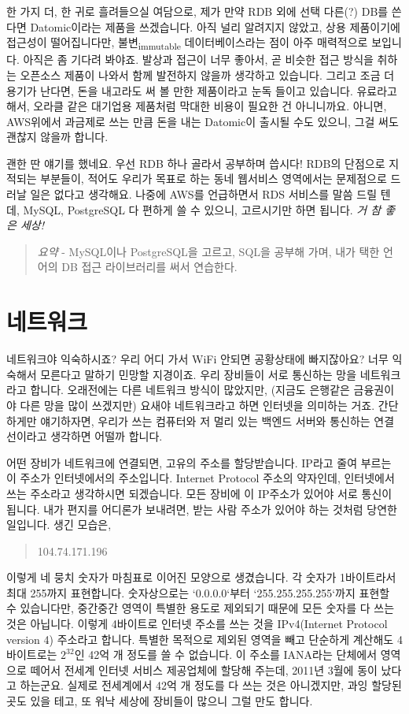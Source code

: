 \documentclass[11pt,a4paper]{article}
\begin{document}
한 가지 더, 한 귀로 흘려들으실 여담으로, 제가 만약 RDB 외에 선택 다른(?) DB를 쓴다면 Datomic이라는 제품을 쓰겠습니다. 아직 널리 알려지지 않았고, 상용 제품이기에 접근성이 떨어집니다만, 불변\textsubscript{immutable} 데이터베이스라는 점이 아주 매력적으로 보입니다. 아직은 좀 기다려 봐야죠. 발상과 접근이 너무 좋아서, 곧 비슷한 접근 방식을 취하는 오픈소스 제품이 나와서 함께 발전하지 않을까 생각하고 있습니다. 그리고 조금 더 용기가 난다면, 돈을 내고라도 써 볼 만한 제품이라고 눈독 들이고 있습니다. 유료라고 해서, 오라클 같은 대기업용 제품처럼 막대한 비용이 필요한 건 아니니까요. 아니면, AWS위에서 과금제로 쓰는 만큼 돈을 내는 Datomic이 출시될 수도 있으니, 그걸 써도 괜찮지 않을까 합니다.

괜한 딴 얘기를 했네요. 우선 RDB 하나 골라서 공부하며 씁시다! RDB의 단점으로 지적되는 부분들이, 적어도 우리가 목표로 하는 동네 웹서비스 영역에서는 문제점으로 드러날 일은 없다고 생각해요. 나중에 AWS를 언급하면서 RDS 서비스를 말씀 드릴 텐데, MySQL, PostgreSQL 다 편하게 쓸 수 있으니, 고르시기만 하면 됩니다. \emph{거 참 좋은 세상!}

\begin{quote}
  \emph{요약} - MySQL이나 PostgreSQL을 고르고, SQL을 공부해 가며, 내가 택한 언어의 DB 접근 라이브러리를 써서 연습한다.
\end{quote}

\section{네트워크}
네트워크야 익숙하시죠? 우리 어디 가서 WiFi 안되면 공황상태에 빠지잖아요? 너무 익숙해서 모른다고 말하기 민망할 지경이죠. 우리 장비들이 서로 통신하는 망을 네트워크라고 합니다. 오래전에는 다른 네트워크 방식이 많았지만, (지금도 은행같은 금융권이야 다른 망을 많이 쓰겠지만) 요새야 네트워크라고 하면 인터넷을 의미하는 거죠. 간단하게만 얘기하자면, 우리가 쓰는 컴퓨터와 저 멀리 있는 백엔드 서버와 통신하는 연결선이라고 생각하면 어떨까 합니다.

어떤 장비가 네트워크에 연결되면, 고유의 주소를 할당받습니다. IP라고 줄여 부르는 이 주소가 인터넷에서의 주소입니다.  Internet Protocol 주소의 약자인데, 인터넷에서 쓰는 주소라고 생각하시면 되겠습니다. 모든 장비에 이 IP주소가 있어야 서로 통신이 됩니다. 내가 편지를 어디론가 보내려면, 받는 사람 주소가 있어야 하는 것처럼 당연한 일입니다. 생긴 모습은,

\begin{quote}
104.74.171.196
\end{quote}

이렇게 네 뭉치 숫자가 마침표로 이어진 모양으로 생겼습니다. 각 숫자가 1바이트라서 최대 255까지 표현합니다. 숫자상으로는 `0.0.0.0`부터 `255.255.255.255`까지 표현할 수 있습니다만, 중간중간 영역이 특별한 용도로 제외되기 때문에 모든 숫자를 다 쓰는 것은 아닙니다. 이렇게 4바이트로 인터넷 주소를 쓰는 것을 IPv4(Internet Protocol version 4) 주소라고 합니다. 특별한 목적으로 제외된 영역을 빼고 단순하게 계산해도 4바이트로는 $2^{32}$인 42억 개 정도를 쓸 수 없습니다. 이 주소를 IANA라는 단체에서 영역으로 떼어서 전세계 인터넷 서비스 제공업체에 할당해 주는데, 2011년 3월에 동이 났다고 하는군요. 실제로 전세계에서 42억 개 정도를 다 쓰는 것은 아니겠지만, 과잉 할당된 곳도 있을 테고, 또 워낙 세상에 장비들이 많으니 그럴 만도 합니다.
\end{document}
